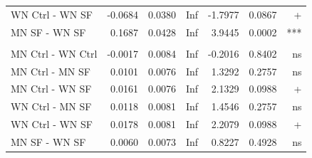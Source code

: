 \documentclass[
  12pt,
  letterpaper,
]{article}
\begin{document}
\begin{longtable}{l|rrrrrr}
WN Ctrl - WN SF & -0.0684 & 0.0380 & Inf & -1.7977 & 0.0867 & + \\ 
MN SF - WN SF & 0.1687 & 0.0428 & Inf & 3.9445 & 0.0002 & *** \\ 
\midrule\addlinespace[2.5pt]
\multicolumn{7}{l}{Other} \\[2.5pt] 
\midrule\addlinespace[2.5pt]
MN Ctrl - WN Ctrl & -0.0017 & 0.0084 & Inf & -0.2016 & 0.8402 & ns \\ 
MN Ctrl - MN SF & 0.0101 & 0.0076 & Inf & 1.3292 & 0.2757 & ns \\ 
MN Ctrl - WN SF & 0.0161 & 0.0076 & Inf & 2.1329 & 0.0988 & + \\ 
WN Ctrl - MN SF & 0.0118 & 0.0081 & Inf & 1.4546 & 0.2757 & ns \\ 
WN Ctrl - WN SF & 0.0178 & 0.0081 & Inf & 2.2079 & 0.0988 & + \\ 
MN SF - WN SF & 0.0060 & 0.0073 & Inf & 0.8227 & 0.4928 & ns \\ 
\bottomrule
\end{longtable}
\endgroup
\end{document}
